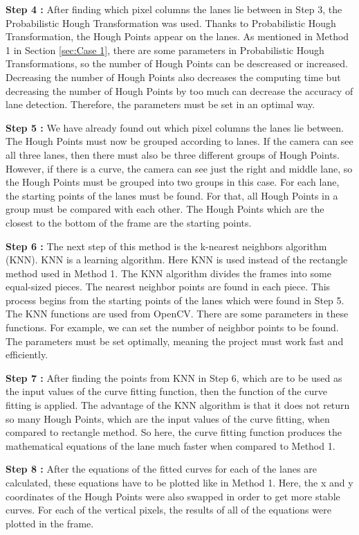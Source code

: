 \textbf{Step 4 : }After finding which pixel columns the lanes lie between in Step 3, the Probabilistic Hough Transformation was used. Thanks to Probabilistic Hough Transformation, the Hough Points appear on the lanes. As mentioned in Method 1 in Section \ref{sec:Case 1}, there are some parameters in Probabilistic Hough Transformations, so the number of Hough Points can be descreased or increased. Decreasing the number of Hough Points also decreases the computing time but decreasing the number of Hough Points by too much can decrease the accuracy of lane detection. Therefore, the parameters must be set in an optimal way.

\textbf{Step 5 : }We have already found out which pixel columns the lanes lie between. The Hough Points must now be grouped according to lanes. If the camera can see all three lanes, then there must also be three different groups of Hough Points. However, if there is a curve, the camera can see just the right and middle lane, so the Hough Points must be grouped into two groups in this case. For each lane, the starting points of the lanes must be found. For that, all Hough Points in a group must be compared with each other. The Hough Points which are the closest to the bottom of the frame are the starting points.

\textbf{Step 6 : }The next step of this method is the k-nearest neighbors algorithm (KNN). KNN is a learning algorithm. Here KNN is used instead of the rectangle method used in Method 1. The KNN algorithm divides the frames into some equal-sized pieces. The nearest neighbor points are found in each piece. This process begins from the starting points of the lanes which were found in Step 5. The KNN functions are used from OpenCV. There are some parameters in these functions. For example, we can set the number of neighbor points to be found. The parameters must be set optimally, meaning the project must work fast and efficiently.

\textbf{Step 7 : }After finding the points from KNN in Step 6, which are to be used as the input values of the curve fitting function, then the function of the curve fitting is applied. The advantage of the KNN algorithm is that it does not return so many Hough Points, which are the input values of the curve fitting, when compared to rectangle method. So here, the curve fitting function produces the mathematical equations of the lane much faster when compared to Method 1.

\textbf{Step 8 : }After the equations of the fitted curves for each of the lanes are calculated, these equations have to be plotted like in Method 1. Here, the x and y coordinates of the Hough Points were also swapped in order to get more stable curves. For each of the vertical pixels, the results of all of the equations were plotted in the frame.


